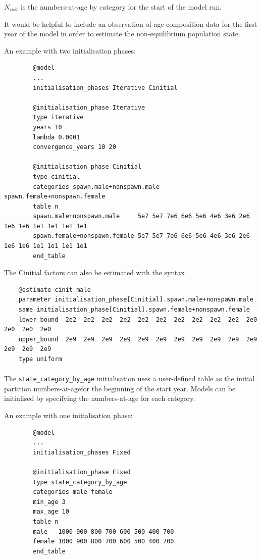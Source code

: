 $N_{init}$ is the numbers-at-age by category for the start of the model run.

It would be helpful to include an observation of age composition data for the first year of the model in order to estimate the non-equilibrium population state.

An example with two initialisation phases:

{\small{\begin{verbatim}
		@model
		...
		initialisation_phases Iterative Cinitial

		@initialisation_phase Iterative
		type iterative
		years 10
		lambda 0.0001
		convergence_years 10 20

		@initialisation_phase Cinitial
		type cinitial
		categories spawn.male+nonspawn.male spawn.female+nonspawn.female
		table n
		spawn.male+nonspawn.male     5e7 5e7 7e6 6e6 5e6 4e6 3e6 2e6 1e6 1e6 1e1 1e1 1e1 1e1
		spawn.female+nonspawn.female 5e7 5e7 7e6 6e6 5e6 4e6 3e6 2e6 1e6 1e6 1e1 1e1 1e1 1e1
		end_table
		\end{verbatim}}}

The Cinitial factors can also be estimated with the syntax

{\small{\begin{verbatim}
	@estimate cinit_male
	parameter initialisation_phase[Cinitial].spawn.male+nonspawn.male
	same initialisation_phase[Cinitial].spawn.female+nonspawn.female
	lower_bound  2e2  2e2  2e2  2e2  2e2  2e2  2e2  2e2  2e2  2e2  2e0  2e0  2e0  2e0
	upper_bound  2e9  2e9  2e9  2e9  2e9  2e9  2e9  2e9  2e9  2e9  2e9  2e9  2e9  2e9
	type uniform
	\end{verbatim}}}

\paragraph{}

The \texttt{state\_category\_by\_age} initialisation uses a user-defined table as the initial partition numbers-at-agefor the beginning of the  start year. Models can be initialised by specifying the numbers-at-age for each category. 

An example with one initialisation phase:

{\small{\begin{verbatim}
		@model
		...
		initialisation_phases Fixed

		@initialisation_phase Fixed
		type state_category_by_age
		categories male female
		min_age 3
		max_age 10
		table n
		male   1000 900 800 700 600 500 400 700
		female 1000 900 800 700 600 500 400 700
		end_table
		\end{verbatim}}}

